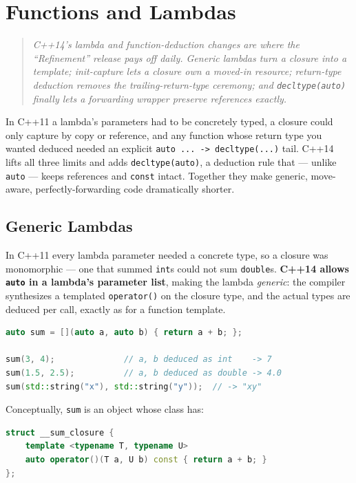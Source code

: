 \chapter{Functions and Lambdas}
\label{ch:c14-functions-and-lambdas}

\begin{quote}
\emph{C++14's lambda and function-deduction changes are where the ``Refinement'' release pays off daily. Generic lambdas turn a closure into a template; init-capture lets a closure own a moved-in resource; return-type deduction removes the trailing-return-type ceremony; and \texttt{decltype(auto)} finally lets a forwarding wrapper preserve references exactly.}
\end{quote}

In C++11 a lambda's parameters had to be concretely typed, a closure could only capture by copy or reference, and any function whose return type you wanted deduced needed an explicit \texttt{auto ... -> decltype(...)} tail. C++14 lifts all three limits and adds \texttt{decltype(auto)}, a deduction rule that --- unlike \texttt{auto} --- keeps references and \texttt{const} intact. Together they make generic, move-aware, perfectly-forwarding code dramatically shorter.

\section{Generic Lambdas}
\label{sec:c14-generic-lambdas}

In C++11 every lambda parameter needed a concrete type, so a closure was monomorphic --- one that summed \texttt{int}s could not sum \texttt{double}s. \textbf{C++14 allows \texttt{auto} in a lambda's parameter list}, making the lambda \emph{generic}: the compiler synthesizes a templated \texttt{operator()} on the closure type, and the actual types are deduced per call, exactly as for a function template.

\begin{lstlisting}[language=C++,caption={A generic lambda is a closure with a templated operator()}]
auto sum = [](auto a, auto b) { return a + b; };

sum(3, 4);              // a, b deduced as int    -> 7
sum(1.5, 2.5);          // a, b deduced as double -> 4.0
sum(std::string("x"), std::string("y"));  // -> "xy"
\end{lstlisting}

Conceptually, \texttt{sum} is an object whose class has:

\begin{lstlisting}[language=C++,caption={The closure type the compiler generates (schematic)}]
struct __sum_closure {
    template <typename T, typename U>
    auto operator()(T a, U b) const { return a + b; }
};
\end{lstlisting}

